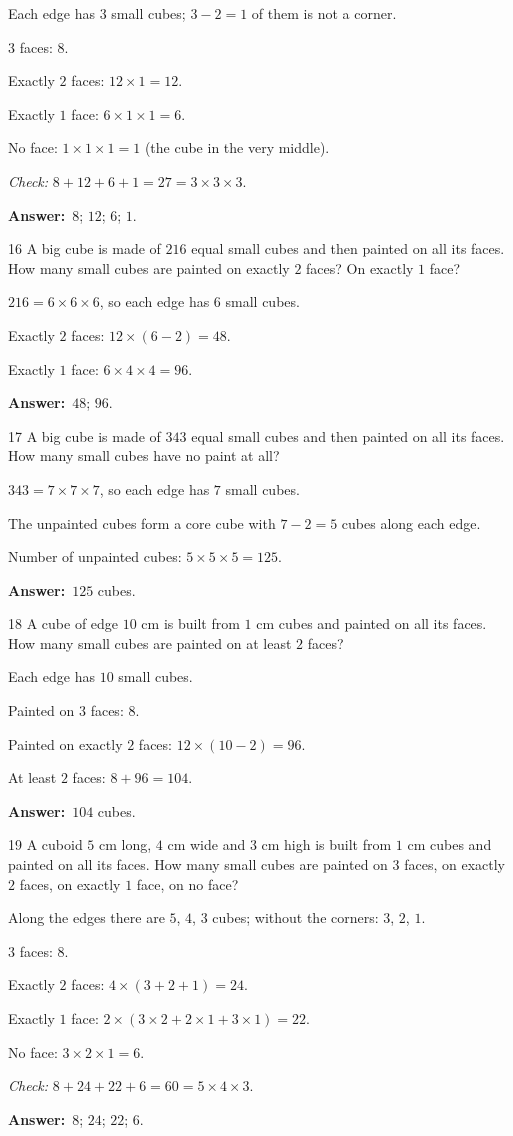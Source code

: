 \documentclass[11pt]{article}
\newif\ifsol \solfalse
\providecommand{\AnsWord}{Đáp số}
\newcommand{\dapso}[1]{\par\textbf{\AnsWord:}\ #1}
\newcommand{\probsol}[1]{%
  \begin{lrbox}{\solmeasure}\begin{minipage}{\dimexpr\linewidth-24pt\relax}#1\end{minipage}\end{lrbox}%
  \ifsol
    \begin{solbox}#1\end{solbox}%
  \else
    \setlength{\solht}{\dimexpr\ht\solmeasure+\dp\solmeasure+0.85cm\relax}%
    \ifdim\solht<1.35cm\setlength{\solht}{1.35cm}\fi
    \begin{tcolorbox}[colback=white,colframe=Line,boxrule=0.8pt,arc=5pt,
      left=8pt,right=8pt,top=4pt,bottom=4pt,height=\solht]{\footnotesize\color{Slate}\itshape\WorkWord}\end{tcolorbox}%
  \fi}
\newcommand{\gap}{\vspace{0.3cm}}
\def\WorkWord{Your work:}
\def\AnsWord{Answer}
\begin{document}
\probsol{
Each edge has $3$ small cubes; $3-2=1$ of them is not a corner.\par
$3$ faces: $8$.\par
Exactly $2$ faces: $12\times1=12$.\par
Exactly $1$ face: $6\times1\times1=6$.\par
No face: $1\times1\times1=1$ (the cube in the very middle).\par
\emph{Check:} $8+12+6+1=27=3\times3\times3$.
\dapso{$8$; $12$; $6$; $1$.}}
\gap
\begin{probbox}{16}{\relax}
A big cube is made of $216$ equal small cubes and then painted on all its faces. How many small cubes are painted on exactly $2$ faces? On exactly $1$ face?
\end{probbox}
\probsol{
$216=6\times6\times6$, so each edge has $6$ small cubes.\par
Exactly $2$ faces: $12\times(6-2)=48$.\par
Exactly $1$ face: $6\times4\times4=96$.
\dapso{$48$; $96$.}}
\gap
\begin{probbox}{17}{\relax}
A big cube is made of $343$ equal small cubes and then painted on all its faces. How many small cubes have no paint at all?
\end{probbox}
\probsol{
$343=7\times7\times7$, so each edge has $7$ small cubes.\par
The unpainted cubes form a core cube with $7-2=5$ cubes along each edge.\par
Number of unpainted cubes: $5\times5\times5=125$.
\dapso{$125$ cubes.}}
\gap
\begin{probbox}{18}{\relax}
A cube of edge $10$ cm is built from $1$ cm cubes and painted on all its faces. How many small cubes are painted on at least $2$ faces?
\end{probbox}
\probsol{
Each edge has $10$ small cubes.\par
Painted on $3$ faces: $8$.\par
Painted on exactly $2$ faces: $12\times(10-2)=96$.\par
At least $2$ faces: $8+96=104$.
\dapso{$104$ cubes.}}
\gap
\begin{probbox}{19}{\relax}
A cuboid $5$ cm long, $4$ cm wide and $3$ cm high is built from $1$ cm cubes and painted on all its faces. How many small cubes are painted on $3$ faces, on exactly $2$ faces, on exactly $1$ face, on no face?
\end{probbox}
\probsol{
Along the edges there are $5$, $4$, $3$ cubes; without the corners: $3$, $2$, $1$.\par
$3$ faces: $8$.\par
Exactly $2$ faces: $4\times(3+2+1)=24$.\par
Exactly $1$ face: $2\times(3\times2+2\times1+3\times1)=22$.\par
No face: $3\times2\times1=6$.\par
\emph{Check:} $8+24+22+6=60=5\times4\times3$.
\dapso{$8$; $24$; $22$; $6$.}}
\end{document}
